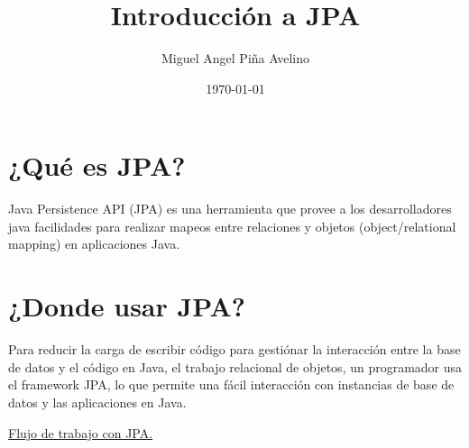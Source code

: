 \documentclass[11pt]{article}
\author{Miguel Angel Piña Avelino}
\date{\today}
\title{Introducción a JPA}
\begin{document}
\maketitle
\tableofcontents


\section{¿Qué es JPA?}
\label{sec-1}
Java Persistence API (JPA) es una herramienta que provee a los desarrolladores
java facilidades para realizar mapeos entre relaciones y objetos (object/relational
mapping) en aplicaciones Java.

\section{¿Donde usar JPA?}
\label{sec-2}

Para reducir la carga de escribir código para gestiónar la interacción entre la
base de datos y el código en Java, el trabajo relacional de objetos, un
programador usa el framework JPA, lo que permite una fácil interacción con
instancias de base de datos y las aplicaciones en Java.

\href{./jpa_provider.png}{Flujo de trabajo con JPA.}
\end{document}
